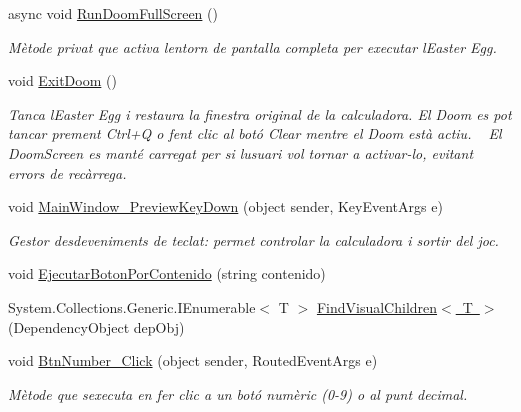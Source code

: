 \begin{DoxyCompactItemize}
async void \mbox{\hyperlink{class_p_a_c4___calculadora_1_1_main_window_a023883a85a8b64c14e91725146630d27}{Run\+Doom\+Full\+Screen}} ()
\begin{DoxyCompactList}\small\item\em Mètode privat que activa l\textquotesingle{}entorn de pantalla completa per executar l\textquotesingle{}Easter Egg. \end{DoxyCompactList}\item 
void \mbox{\hyperlink{class_p_a_c4___calculadora_1_1_main_window_a1b0f5b87aa37a064fb973e1cd3910816}{Exit\+Doom}} ()
\begin{DoxyCompactList}\small\item\em Tanca l\textquotesingle{}Easter Egg i restaura la finestra original de la calculadora. El Doom es pot tancar prement Ctrl+Q o fent clic al botó Clear mentre el Doom està actiu. ~\newline
El Doom\+Screen es manté carregat per si l\textquotesingle{}usuari vol tornar a activar-\/lo, evitant errors de recàrrega. \end{DoxyCompactList}\item 
void \mbox{\hyperlink{class_p_a_c4___calculadora_1_1_main_window_a3209540a4b7763138f82d9311887f17e}{Main\+Window\+\_\+\+Preview\+Key\+Down}} (object sender, Key\+Event\+Args e)
\begin{DoxyCompactList}\small\item\em Gestor d\textquotesingle{}esdeveniments de teclat\+: permet controlar la calculadora i sortir del joc. \end{DoxyCompactList}\item 
void \mbox{\hyperlink{class_p_a_c4___calculadora_1_1_main_window_accd06121801821a3d11500cc79293ff7}{Ejecutar\+Boton\+Por\+Contenido}} (string contenido)
\item 
System.\+Collections.\+Generic.\+I\+Enumerable$<$ T $>$ \mbox{\hyperlink{class_p_a_c4___calculadora_1_1_main_window_a6c67cf368bc6cddc47d21def635bb27b}{Find\+Visual\+Children$<$ T $>$}} (Dependency\+Object dep\+Obj)
\item 
void \mbox{\hyperlink{class_p_a_c4___calculadora_1_1_main_window_ab4d09576c518172d01427afd0e967127}{Btn\+Number\+\_\+\+Click}} (object sender, Routed\+Event\+Args e)
\begin{DoxyCompactList}\small\item\em Mètode que s\textquotesingle{}executa en fer clic a un botó numèric (0-\/9) o al punt decimal. \end{DoxyCompactList}\item 

\end{DoxyCompactItemize}
